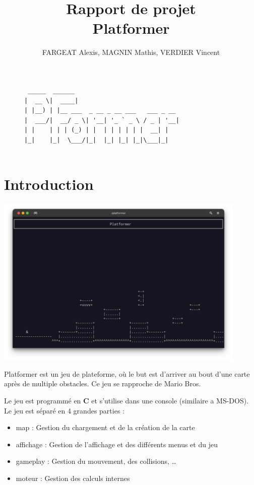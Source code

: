 \documentclass[12pt]{article}
\title{Rapport de projet\\ Platformer}
\author{\small FARGEAT Alexis, MAGNIN Mathis, VERDIER Vincent}
\begin{document}
	\maketitle

	\begin{figure}[H]
		\centering
		\begin{BVerbatim}
 _____  ______                               
|  __ \|  ____|                             
| |__) | |__ ___  _ __ _ __ ___   ___ _ __   
|  ___/|  __/ _ \| '__| '_ ` _ \ / _ | '__|
| |    | | | (_) | |  | | | | | |  __| |     
|_|    |_|  \___/|_|  |_| |_| |_|\___|_|   


		\end{BVerbatim}
	\end{figure}

	\tableofcontents
	\newpage

	\section{Introduction}
	
		\begin{center}
			\includegraphics[width=0.90\textwidth]{content/image.png}
		\end{center}
	
		Platformer est un jeu de plateforme, où le but est d'arriver au bout d'une carte après de multiple obstacles.
		Ce jeu se rapproche de Mario Bros.
	
		Le jeu est programmé en \textbf{C} et s'utilise dans une console (similaire a MS-DOS).\\

		Le jeu est séparé en 4 grandes parties :
		\begin{itemize}
			\item map : Gestion du chargement et de la création de la carte
			\item affichage : Gestion de l'affichage et des différents menus et du jeu
			\item gameplay : Gestion du mouvement, des collisions, \dots
			\item moteur : Gestion des calculs internes\\
		\end{itemize}
	
\end{document}
